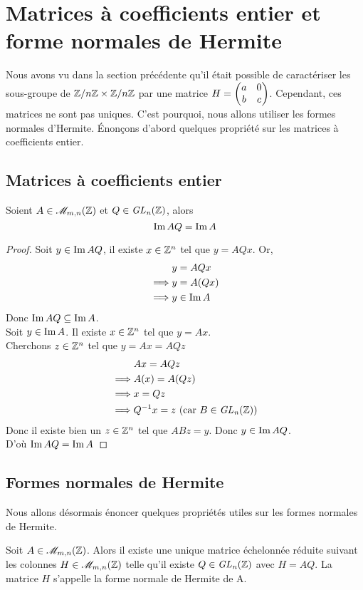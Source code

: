 \documentclass[11pt]{article}
\begin{document}
\section{Matrices à coefficients entier et forme normales de Hermite}
Nous avons vu dans la section précédente qu'il était possible de caractériser les sous-groupe de
$\mathbb Z/n\mathbb Z \times \mathbb Z/n\mathbb Z$ par une matrice $H = \begin{pmatrix} a & 0\\ b & c \end{pmatrix}$. Cependant, ces matrices ne sont pas uniques. C'est
pourquoi, nous allons utiliser les formes normales d'Hermite.
Énonçons d'abord quelques propriété sur les matrices à coefficients entier.
\subsection{Matrices à coefficients entier}
\begin{proposition}
	Soient $A \in \mathscr{M}_{m,n}(\mathbb Z)$ et $Q \in \it {GL}_n(\mathbb Z)$, alors
	$$\operatorname{Im} AQ = \operatorname{Im} A$$
\end{proposition}
\begin{proof}
	Soit $y \in \operatorname{Im} AQ$, il existe $x \in \mathbb Z^n$ tel que $y = AQx$. Or,
	\begin{align*}
		         & y = AQx     \\
		\implies & y = A(Qx)   \\
		\implies & y \in \operatorname{Im} A
	\end{align*}
	Donc $\operatorname{Im} AQ \subseteq \operatorname{Im} A$.\\
	Soit $y \in \operatorname{Im} A$. Il existe $x \in \mathbb Z^n$ tel que $y = Ax$.\\
	Cherchons $z \in \mathbb Z^n$ tel que $y = Ax = AQz$
	\begin{align*}
		         & Ax = AQz                                     \\
		\implies & A(x) = A(Qz)                                 \\
		\implies & x = Qz                                       \\
		\implies & Q^{-1} x = z \text{ (car $B \in \it {GL}_n(\mathbb Z)$)}
	\end{align*}
	Donc il existe bien un $z \in \mathbb Z^n$ tel que $ABz = y$. Donc $y \in \operatorname{Im} AQ$.\\
	D'où $\operatorname{Im} AQ = \operatorname{Im} A$

\end{proof}
\subsection{Formes normales de Hermite}
Nous allons désormais énoncer quelques propriétés utiles sur les formes normales de Hermite.
\begin{definition}
	Soit $A \in \mathscr{M}_{m,n}(\mathbb Z)$. Alors il existe une unique matrice échelonnée
	réduite suivant les colonnes $H \in \mathscr{M}_{m,n}(\mathbb Z)$ telle qu'il existe $Q \in \it {GL}_n(\mathbb Z)$
	avec $H = AQ$. La matrice $H$ s'appelle la forme normale de Hermite de A.
\end{definition}
\end{document}
